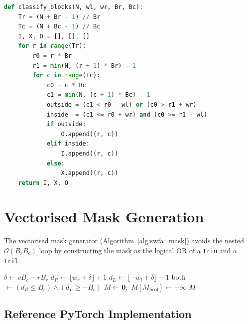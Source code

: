 \begin{lstlisting}[language=Python,basicstyle=\ttfamily\scriptsize]
def classify_blocks(N, wl, wr, Br, Bc):
    Tr = (N + Br - 1) // Br
    Tc = (N + Bc - 1) // Bc
    I, X, O = [], [], []
    for r in range(Tr):
        r0 = r * Br
        r1 = min(N, (r + 1) * Br) - 1
        for c in range(Tc):
            c0 = c * Bc
            c1 = min(N, (c + 1) * Bc) - 1
            outside = (c1 < r0 - wl) or (c0 > r1 + wr)
            inside  = (c1 <= r0 + wr) and (c0 >= r1 - wl)
            if outside:
                O.append((r, c))
            elif inside:
                I.append((r, c))
            else:
                X.append((r, c))
    return I, X, O
\end{lstlisting}

\section{Vectorised Mask Generation}\label{app:mask}

The vectorised mask generator (Algorithm~\ref{alg:swfa_mask}) avoids
the nested $\mathcal{O}(B_r B_c)$ loop by constructing the mask as the
logical OR of a \texttt{triu} and a \texttt{tril}.

\begin{algorithm}[H]
    \caption{\textsc{GenerateMask}: reference version.}
    \label{alg:appendix_mask}
    $\delta \leftarrow c B_c - r B_r$\;
    $d_R \leftarrow \lfloor w_r + \delta \rfloor + 1$\;
    $d_L \leftarrow \lfloor -w_l + \delta \rfloor - 1$\;
    both $\leftarrow (d_R \le B_r) \wedge (d_L \ge -B_c)$\;
    $M \leftarrow \mathbf{0}$;\
    $M[M_{\mathrm{bool}}] \leftarrow -\infty$\;
    \Return $M$\;
\end{algorithm}

\subsection{Reference PyTorch Implementation}

